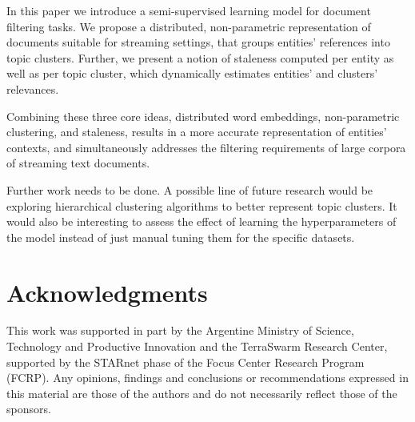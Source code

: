 \documentclass{article}
\begin{document}
In this paper we introduce a semi-supervised learning model for document filtering tasks. We propose a distributed, non-parametric representation of documents suitable for streaming settings, that groups entities' references into topic clusters. Further, we present a notion of staleness computed per entity as well as per topic cluster, which dynamically estimates entities' and clusters' relevances.

Combining these three core ideas, distributed word embeddings, non-parametric clustering, and staleness, results in a more accurate representation of entities' contexts, and simultaneously addresses the filtering requirements of large corpora of streaming text documents.

Further work needs to be done. A possible line of future research would be exploring hierarchical clustering algorithms to better represent topic clusters. It would also be interesting to assess the effect of learning the hyperparameters of the model instead of just manual tuning them for the specific datasets.

\section*{Acknowledgments} 
 
This work was supported in part by the Argentine Ministry of Science, Technology and Productive Innovation and the TerraSwarm Research Center, supported by the STARnet phase of the Focus Center Research Program (FCRP). Any opinions, findings and conclusions or recommendations expressed in this material are those of the authors and do not necessarily reflect those of the sponsors.



\end{document}
